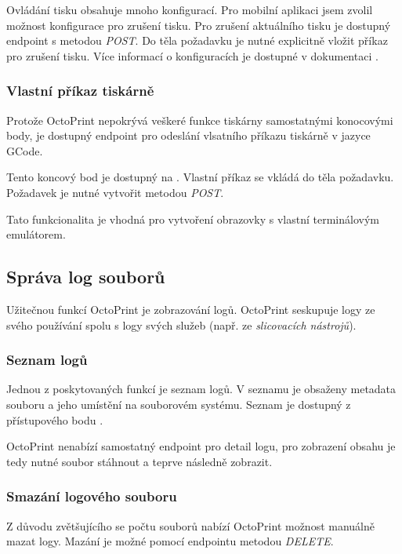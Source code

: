Ovládání tisku obsahuje mnoho konfigurací.
Pro mobilní aplikaci jsem zvolil možnost konfigurace pro zrušení tisku.
Pro zrušení aktuálního tisku je dostupný endpoint  s metodou \textit{POST}.
Do těla požadavku je nutné explicitně vložit příkaz pro zrušení tisku.
Více informací o konfiguracích je dostupné v dokumentaci \cite{octoprint-docs-job}.

\subsubsection*{Vlastní příkaz tiskárně}

Protože OctoPrint nepokrývá veškeré funkce tiskárny samostatnými konocovými body, je dostupný endpoint pro odeslání vlsatního příkazu tiskárně v jazyce GCode.

Tento koncový bod je dostupný na .
Vlastní příkaz se vkládá do těla požadavku.
Požadavek je nutné vytvořit metodou \textit{POST}.

Tato funkcionalita je vhodná pro vytvoření obrazovky s vlastní terminálovým emulátorem.

\subsection{Správa log souborů}

Užitečnou funkcí OctoPrint je zobrazování logů.
OctoPrint seskupuje logy ze svého používání spolu s logy svých služeb (např. ze \textit{slicovacích nástrojů}).

\subsubsection*{Seznam logů}

Jednou z poskytovaných funkcí je seznam logů.
V seznamu je obsaženy metadata souboru a jeho umístění na souborovém systému.
Seznam je dostupný z přístupového bodu .

OctoPrint nenabízí samostatný endpoint pro detail logu, pro zobrazení obsahu je tedy nutné soubor stáhnout a teprve následně zobrazit.

\subsubsection*{Smazání logového souboru}

Z důvodu zvětšujícího se počtu souborů nabízí OctoPrint možnost manuálně mazat logy.
Mazání je možné pomocí endpointu  metodou \textit{DELETE}.
